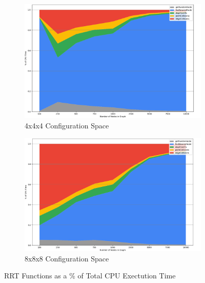\begin{figure}[H]
\begin{center}

    \begin{subfigure}{\textwidth}
    \begin{center}
    \includegraphics[draft=false,width=\linewidth,height=0.3\paperheight]{chapters/chapter2/img/profiling/4x4x4/performance.png}
    \caption{4x4x4 Configuration Space}
    \label{subfig:4x4x4rrt}
    \end{center}
    \end{subfigure}
    \begin{subfigure}{\textwidth}
    \begin{center}
    \includegraphics[draft=false,width=\linewidth,height=0.3\paperheight]{chapters/chapter2/img/profiling/8x8x8/performance.png}
    \caption{8x8x8 Configuration Space}
    \label{subfig:8x8x8rrt}
    \end{center}
    \end{subfigure}
    \caption{\ac{RRT} Functions as a \% of Total CPU Exectution Time}
\end{center}
\end{figure}

